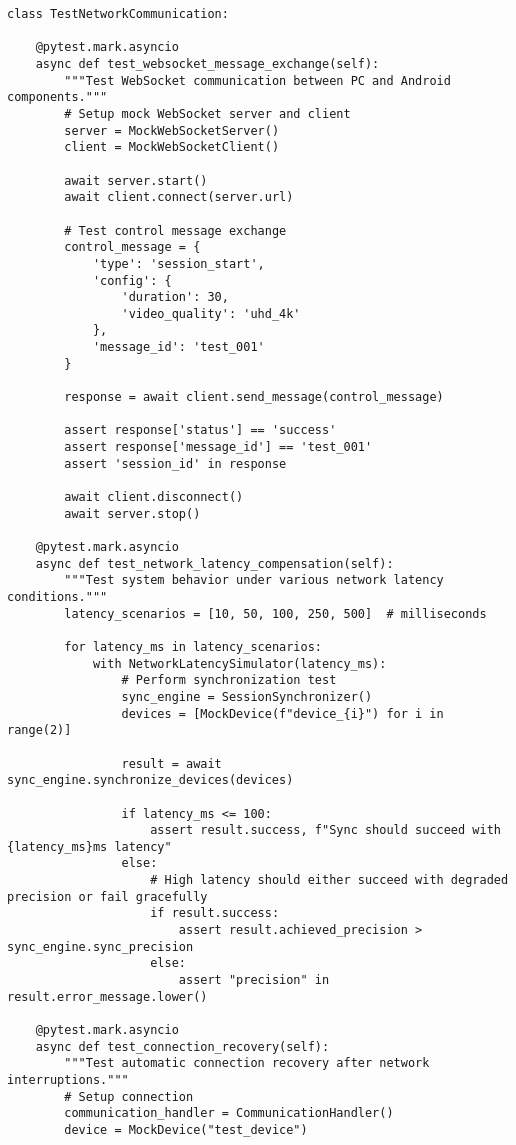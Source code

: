 \documentclass[12pt,a4paper]{report}
\begin{document}
\begin{verbatim}
class TestNetworkCommunication:

    @pytest.mark.asyncio
    async def test_websocket_message_exchange(self):
        """Test WebSocket communication between PC and Android components."""
        # Setup mock WebSocket server and client
        server = MockWebSocketServer()
        client = MockWebSocketClient()

        await server.start()
        await client.connect(server.url)

        # Test control message exchange
        control_message = {
            'type': 'session_start',
            'config': {
                'duration': 30,
                'video_quality': 'uhd_4k'
            },
            'message_id': 'test_001'
        }

        response = await client.send_message(control_message)

        assert response['status'] == 'success'
        assert response['message_id'] == 'test_001'
        assert 'session_id' in response

        await client.disconnect()
        await server.stop()

    @pytest.mark.asyncio
    async def test_network_latency_compensation(self):
        """Test system behavior under various network latency conditions."""
        latency_scenarios = [10, 50, 100, 250, 500]  # milliseconds

        for latency_ms in latency_scenarios:
            with NetworkLatencySimulator(latency_ms):
                # Perform synchronization test
                sync_engine = SessionSynchronizer()
                devices = [MockDevice(f"device_{i}") for i in range(2)]

                result = await sync_engine.synchronize_devices(devices)

                if latency_ms <= 100:
                    assert result.success, f"Sync should succeed with {latency_ms}ms latency"
                else:
                    # High latency should either succeed with degraded precision or fail gracefully
                    if result.success:
                        assert result.achieved_precision > sync_engine.sync_precision
                    else:
                        assert "precision" in result.error_message.lower()

    @pytest.mark.asyncio
    async def test_connection_recovery(self):
        """Test automatic connection recovery after network interruptions."""
        # Setup connection
        communication_handler = CommunicationHandler()
        device = MockDevice("test_device")


\end{verbatim}
\end{document}
